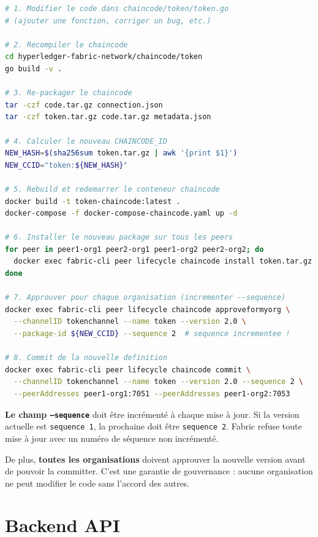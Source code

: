 \documentclass[12pt,a4paper,twoside]{report}
\begin{document}
\begin{lstlisting}[language=bash, caption=Procédure de mise à jour du chaincode]
# 1. Modifier le code dans chaincode/token/token.go
# (ajouter une fonction, corriger un bug, etc.)

# 2. Recompiler le chaincode
cd hyperledger-fabric-network/chaincode/token
go build -v .

# 3. Re-packager le chaincode
tar -czf code.tar.gz connection.json
tar -czf token.tar.gz code.tar.gz metadata.json

# 4. Calculer le nouveau CHAINCODE_ID
NEW_HASH=$(sha256sum token.tar.gz | awk '{print $1}')
NEW_CCID="token:${NEW_HASH}"

# 5. Rebuild et redemarrer le conteneur chaincode
docker build -t token-chaincode:latest .
docker-compose -f docker-compose-chaincode.yaml up -d

# 6. Installer le nouveau package sur tous les peers
for peer in peer1-org1 peer2-org1 peer1-org2 peer2-org2; do
  docker exec fabric-cli peer lifecycle chaincode install token.tar.gz
done

# 7. Approuver pour chaque organisation (incrementer --sequence)
docker exec fabric-cli peer lifecycle chaincode approveformyorg \
  --channelID tokenchannel --name token --version 2.0 \
  --package-id ${NEW_CCID} --sequence 2  # sequence incrementee !

# 8. Commit de la nouvelle definition
docker exec fabric-cli peer lifecycle chaincode commit \
  --channelID tokenchannel --name token --version 2.0 --sequence 2 \
  --peerAddresses peer1-org1:7051 --peerAddresses peer1-org2:7053
\end{lstlisting}

\begin{dangerbox}
\textbf{Le champ \texttt{--sequence}} doit être incrémenté à chaque mise à jour. Si la version actuelle est \texttt{sequence 1}, la prochaine doit être \texttt{sequence 2}. Fabric refuse toute mise à jour avec un numéro de séquence non incrémenté.

De plus, \textbf{toutes les organisations} doivent approuver la nouvelle version avant de pouvoir la committer. C'est une garantie de gouvernance : aucune organisation ne peut modifier le code sans l'accord des autres.
\end{dangerbox}


\chapter{Backend API}
\end{document}
